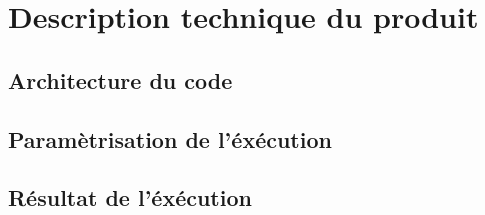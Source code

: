 \section{Description technique du produit}

\subsection{Architecture du code}

\subsection{Paramètrisation de l'éxécution}

\subsection{Résultat de l'éxécution}
